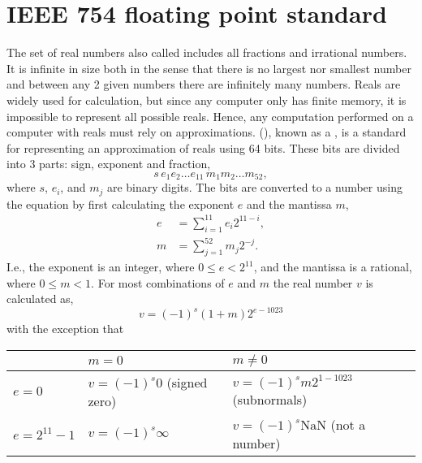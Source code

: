 \section{IEEE 754 floating point standard}
\label{sec:floatingPoint}
The set of real numbers also called  includes all fractions and irrational numbers. It is infinite in size both in the sense that there is no largest nor smallest number and between any 2 given numbers there are infinitely many numbers. Reals are widely used for calculation, but since any computer only has finite memory, it is impossible to represent all possible reals. Hence, any computation performed on a computer with reals must rely on approximations.  (), known as a , is a standard for representing an approximation of reals using 64 bits. These bits are divided into 3 parts: sign, exponent and fraction, 
\begin{displaymath}
  s\, e_1 e_2 \ldots e_{11}\, m_1 m_2 \ldots m_{52},
\end{displaymath}
where $s$, $e_i$, and $m_j$ are binary digits. The bits are converted to a number using the equation by first calculating the exponent $e$ and the mantissa $m$,
\begin{align}
  e &= \sum _{i=1}^{11}e_i2^{11-i},\\
  m & = \sum _{j=1}^{52}m_j2^{-j}.
\end{align}
I.e., the exponent is an integer, where $0 \leq e < 2^{11}$, and the mantissa is a rational, where $0 \leq m < 1$. For most combinations of $e$ and $m$ the real number $v$ is calculated as,
\begin{equation}
  v = \left(-1\right)^{s} \left(1+m\right) 2^{e-1023}
\end{equation}
 with the exception that
\begin{center}
  \begin{tabular}{|l|l|l|}
    \hline
                         & $m=0$                                   & $m\neq 0$\\
    \hline
    $e=0$           & $v = \left(-1\right)^{s} 0$ (signed zero) & $v = \left(-1\right)^{s} m 2^{1-1023}$ (subnormals)\\
    \hline 
    $e=2^{11}-1$ & $v = \left(-1\right)^{s} \infty$               & $v = \left(-1\right)^{s} \text{NaN}$ (not a number)\\
    \hline
  \end{tabular}
\end{center}
